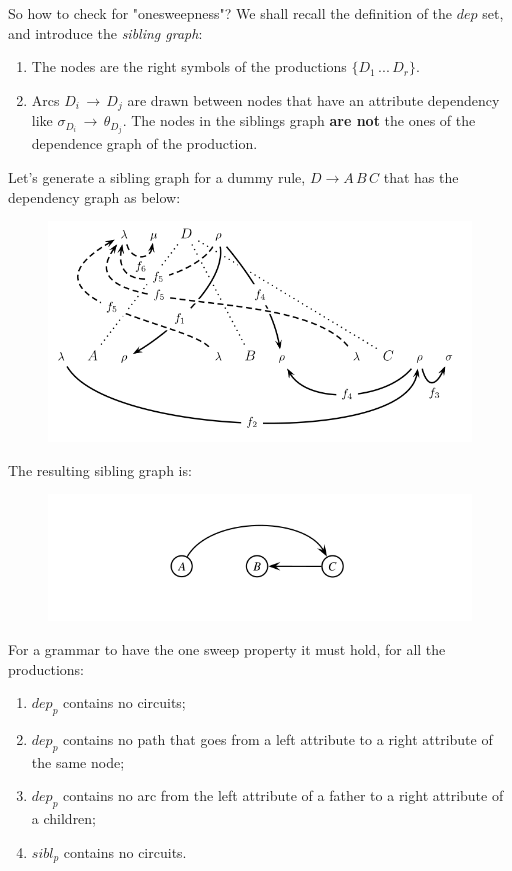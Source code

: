 					So how to check for "onesweepness"? We shall recall the definition of the $dep$ set, and introduce the \emph{sibling graph}:
					\begin{enumerate}
						\item The nodes are the right symbols of the productions $\{D_1\,...\,D_r\}$.
						\item Arcs $D_i \,\rightarrow\, D_j$ are drawn between nodes that have an attribute dependency like 
						$\sigma_{D_i} \,\rightarrow\, \theta_{D_j}$. The nodes in the siblings graph \textbf{are not} the ones of the dependence graph of the 
						production. 
					\end{enumerate}
					Let's generate a sibling graph for a dummy rule, $D\rightarrow A\,B\,C$ that has the dependency graph as below:
					\begin{figure}[H]
						\centering
						\includegraphics[width = \textwidth]{./images/dummyRule.png}
					\end{figure}
					The resulting sibling graph is:
					\begin{figure}[H]
						\centering
						\includegraphics[width = \textwidth]{./images/sibling.png}
					\end{figure}
					For a grammar to have the one sweep property it must hold, for all the productions:
					\begin{enumerate}
						\item $dep_p$ contains no circuits;
						\item $dep_p$ contains no path that goes from a left attribute to a right attribute of the same node;
						\item $dep_p$ contains no arc from the left attribute of a father to a right attribute of a children;
						\item $sibl_p$ contains no circuits. 
					\end{enumerate}
			
